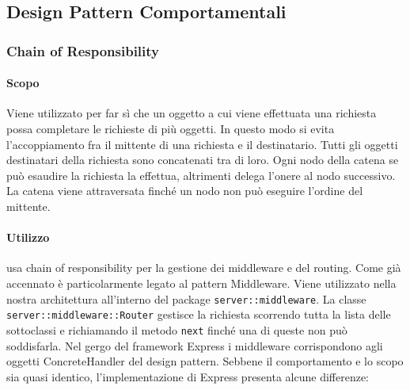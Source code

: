 \documentclass[12pt,a4paper]{article}
\begin{document}
\subsection{Design Pattern Comportamentali}
\subsubsection{Chain of Responsibility}

\paragraph{Scopo}
Viene utilizzato per far sì che un oggetto a cui viene effettuata una richiesta possa completare le richieste di più oggetti. In questo modo si evita l’accoppiamento fra il mittente di una richiesta e il destinatario. Tutti gli oggetti destinatari della richiesta sono concatenati tra di loro. Ogni nodo della catena se può esaudire la richiesta la effettua, altrimenti delega l’onere al nodo successivo. La catena viene attraversata finché un nodo non può eseguire l’ordine del mittente.

\paragraph{Utilizzo}
 usa chain of responsibility per la gestione dei middleware e del routing. Come già accennato è particolarmente legato al pattern Middleware. Viene utilizzato nella nostra architettura all’interno del package \texttt{server::middleware}. La classe \texttt{server::middleware::Router} gestisce la richiesta scorrendo tutta la lista delle sottoclassi e richiamando il metodo \texttt{next} finché una di queste non può soddisfarla. Nel gergo del framework Express i middleware corrispondono agli oggetti ConcreteHandler del design pattern. Sebbene il comportamento e lo scopo sia quasi identico, l’implementazione di Express presenta alcune differenze:
\end{document}
